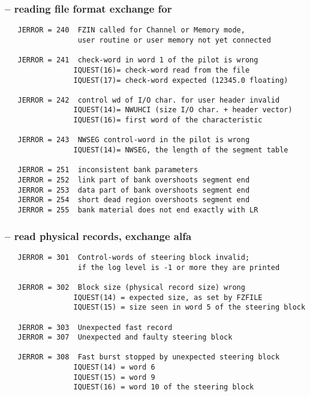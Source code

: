 \subsubsection*{ -- reading file format exchange for }

\begin{verbatim}
   JERROR = 240  FZIN called for Channel or Memory mode,
                 user routine or user memory not yet connected

   JERROR = 241  check-word in word 1 of the pilot is wrong
                IQUEST(16)= check-word read from the file
                IQUEST(17)= check-word expected (12345.0 floating)

   JERROR = 242  control wd of I/O char. for user header invalid
                IQUEST(14)= NWUHCI (size I/O char. + header vector)
                IQUEST(16)= first word of the characteristic

   JERROR = 243  NWSEG control-word in the pilot is wrong
                IQUEST(14)= NWSEG, the length of the segment table

   JERROR = 251  inconsistent bank parameters
   JERROR = 252  link part of bank overshoots segment end
   JERROR = 253  data part of bank overshoots segment end
   JERROR = 254  short dead region overshoots segment end
   JERROR = 255  bank material does not end exactly with LR
\end{verbatim}

\subsubsection{ -- read physical records, exchange alfa}

\begin{verbatim}
   JERROR = 301  Control-words of steering block invalid;
                 if the log level is -1 or more they are printed

   JERROR = 302  Block size (physical record size) wrong
                IQUEST(14) = expected size, as set by FZFILE
                IQUEST(15) = size seen in word 5 of the steering block

   JERROR = 303  Unexpected fast record
   JERROR = 307  Unexpected and faulty steering block

   JERROR = 308  Fast burst stopped by unexpected steering block
                IQUEST(14) = word 6
                IQUEST(15) = word 9
                IQUEST(16) = word 10 of the steering block
\end{verbatim}

